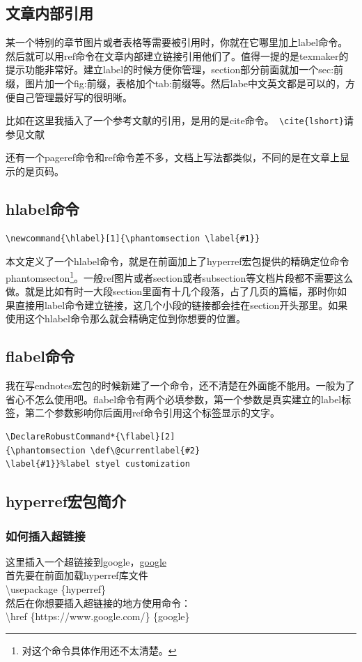 \documentclass[12pt,oneside]{book}
\begin{document}
\begin{common-format}
\subsection{文章内部引用}
某一个特别的章节图片或者表格等需要被引用时，你就在它哪里加上label命令。然后就可以用ref命令在文章内部建立链接引用他们了。值得一提的是texmaker的提示功能非常好。建立label的时候方便你管理，section部分前面就加一个sec:前缀，图片加一个fig:前缀，表格加个tab:前缀等。然后labe中文英文都是可以的，方便自己管理最好写的很明晰。

比如在这里我插入了一个参考文献的引用，是用的是cite命令。\verb+ \cite{lshort}+请参见文献\cite{lshort}

还有一个pageref命令和ref命令差不多，文档上写法都类似，不同的是在文章上显示的是页码。

\subsection{hlabel命令}
\begin{Verbatim}
\newcommand{\hlabel}[1]{\phantomsection \label{#1}}
\end{Verbatim}

本文定义了一个hlabel命令，就是在前面加上了hyperref宏包提供的精确定位命令phantomsecton\footnote{对这个命令具体作用还不太清楚。}。一般ref图片或者section或者subsection等文档片段都不需要这么做。就是比如有时一大段section里面有十几个段落，占了几页的篇幅，那时你如果直接用label命令建立链接，这几个小段的链接都会挂在section开头那里。如果使用这个hlabel命令那么就会精确定位到你想要的位置。


\subsection{flabel命令}
我在写endnotes宏包的时候新建了一个命令，还不清楚在外面能不能用。一般为了省心不怎么使用吧。flabel命令有两个必填参数，第一个参数是真实建立的label标签，第二个参数影响你后面用ref命令引用这个标签显示的文字。
\begin{Verbatim}
\DeclareRobustCommand*{\flabel}[2]
{\phantomsection \def\@currentlabel{#2}
\label{#1}}%label styel customization
\end{Verbatim}


\subsection{hyperref宏包简介}
\subsubsection{如何插入超链接}
这里插入一个超链接到google，\href{https://www.google.com/}{google}\\
首先要在前面加载hyperref库文件\\
\textbackslash usepackage \{hyperref\}\\
然后在你想要插入超链接的地方使用命令：\\
\textbackslash href \{https://www.google.com/\} \{google\}


\end{common-format}
\end{document}
